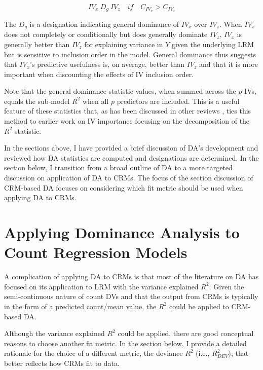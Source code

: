 \documentclass[ShortAfour,times,sageapa]{sagej}
\begin{document}
	\begin{equation}
		IV_x \ D_g \ IV_z \quad if \quad C_{IV_x} > C_{IV_z}
		\label{eq:gendom}
	\end{equation}
	
	The $D_g$ is a designation indicating general dominance of $IV_x$ over $IV_z$.	
	When $IV_x$ does not completely or conditionally but does generally dominate $IV_z$, $IV_x$ is generally better than $IV_z$ for explaining variance in $Y$ given the underlying LRM but is sensitive to inclusion order in the model.
	General dominance thus suggests that $IV_x$'s predictive usefulness is, on average, better than $IV_z$ and that it is more important when discounting the effects of IV inclusion order.
	
	Note that the  general dominance statistic values, when summed across the $p$ IVs, equals the sub-model $R^2$ when all $p$ predictors are included.
	This is a useful feature of these statistics that, as has been discussed in other reviews \cite{gromping2007estimators,johnson2004history}, ties this method to earlier work on IV importance focusing on the decomposition of the $R^2$ statistic.

	In the sections above, I have provided a brief discussion of DA's development and reviewed how DA statistics are computed and designations are determined.
	In the section below, I transition from a broad outline of DA to a more targeted discussion on application of DA to CRMs.
	The focus of the section discussion of CRM-based DA focuses on considering which fit metric should be used when applying DA to CRMs.
	
\section{Applying Dominance Analysis to Count Regression Models}

	A complication of applying DA to CRMs is that most of the literature on DA has focused on its application to LRM with the variance explained $R^2$.
	Given the semi-continuous nature of count DVs and that the output from CRMs is typically in the form of a predicted count/mean value, the $R^2$ could be applied to CRM-based DA.
	
	Although the variance explained $R^2$ could be applied, there are good conceptual reasons to choose another fit metric. 
	In the section below, I provide a detailed rationale for the choice of a different metric, the deviance $R^2$ (i.e., $R^2_{DEV}$), that better reflects how CRMs fit to data. 
	
\end{document}
